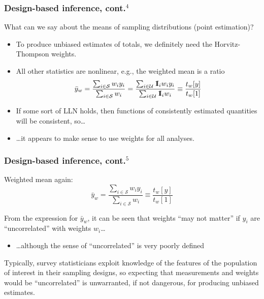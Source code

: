 \documentclass[aspectratio=43]{beamer}
\newcommand{\One}{{\rm 1\kern-0.3em I}}
\begin{document}
\begin{frame}\frametitle{Design-based inference, cont.$^4$}

What can we say about the means of sampling distributions (point estimation)?

\begin{itemize}
    \item To produce unbiased estimates of totals, we definitely need the Horvitz-Thompson weights.
    \item All other statistics are nonlinear, e.g., the weighted mean is a ratio
        $$ \bar y_w = \frac{\sum_{i\in\mathcal{S}} w_i y_i}{\sum_{i\in\mathcal{S}} w_i} 
        = \frac{\sum_{i \in \mathcal{U}} \One_i w_i y_i }{\sum_{i \in \mathcal{U}} \One_i w_i} 
        \equiv \frac{t_w[y]}{t_w[1]} $$
    \item If some sort of LLN holds, then functions of consistently estimated quantities
        will be consistent, so\ldots
    \item \ldots it appears to make sense to use weights for all analyses.
\end{itemize}

\end{frame}

\begin{frame}\frametitle{Design-based inference, cont.$^5$}

Weighted mean again:
$$ \bar y_w = \frac{\sum_{i\in\mathcal{S}} w_i y_i}{\sum_{i\in\mathcal{S}} w_i} \equiv \frac{t_w[y]}{t_w[1]} $$

\bigskip

From the expression for $\bar y_w$, it can be seen that weights ``may not matter'' 
if $y_i$ are ``uncorrelated'' with weights $w_i$\ldots
\begin{itemize}
    \item \ldots although the sense of ``uncorrelated'' is very poorly defined
    \citep{chen:elliott:etal:2017}
\end{itemize}
Typically, survey statisticians exploit knowledge of the features of the population of interest
in their sampling designs, so expecting that measurements and weights would be ``uncorrelated'' is
unwarranted, if not dangerous, for producing unbiased estimates.

\end{frame}
\end{document}
